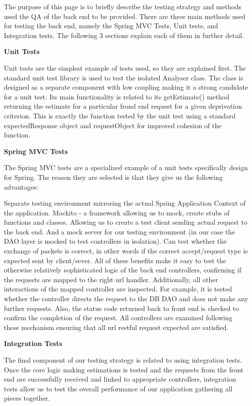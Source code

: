 \documentclass{l3proj}
\begin{document}
The purpose of this page is to briefly describe the testing strategy and methods used the QA of the back end to be provided. There are three main methods used for testing the back end, namely the Spring MVC Tests, Unit tests, and Integration tests. The following 3 sections explain each of them in further detail.

\textbf{Unit Tests}

Unit tests are the simplest example of tests used, so they are explained first. The standard unit test library is used to test the isolated Analyser class. The class is designed as a separate component with low coupling making it a strong candidate for a unit test. Its main functionality is related to its getEstimate() method returning the estimate for a particular frond end request for a given deprivation criterion. This is exactly the function tested by the unit test using a standard expectedResponse object and requestObject for improved cohesion of the function.

\textbf{Spring MVC Tests}

The Spring MVC tests are a specialized example of a unit tests specifically design for Spring. The reason they are selected is that they give us the following advantages:

Separate testing environment mirroring the actual Spring Application Context of the application.
Mockito - a framework allowing us to mock, create stubs of functions and classes.
Allowing us to create a test client sending actual request to the back end.
And a mock server for our testing environment (in our case the DAO layer is mocked to test controllers in isolation).
Can test whether the exchange of packets is correct, in other words if the correct accept/request type is expected sent by client/sever.
All of these benefits make it easy to test the otherwise relatively sophisticated logic of the back end controllers, confirming if the requests are mapped to the right url handler. Additionally, all other interactions of the mapped controller are inspected. For example, it is tested whether the controller directs the request to the DB DAO and does not make any further requests. Also, the status code returned back to front end is checked to confirm the completion of the request. All controllers are examined following these mechanism ensuring that all url restful request expected are satisfied.

\textbf{Integration Tests}

The final component of our testing strategy is related to using integration tests. Once the core logic making estimations is tested and the requests from the front end are successfully received and linked to appropriate controllers, integration tests allow us to test the overall performance of our application gathering all pieces together.
\end{document}
